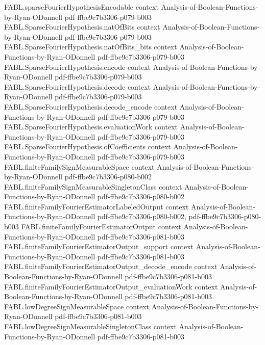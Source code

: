 \begin{theorem}
  {FABL.sparseFourierHypothesisEncodable}
  {context}
  {Analysis-of-Boolean-Functions-by-Ryan-ODonnell}
  {pdf-ffbe9c7b3306-p079-b003}
\proofstep
  {FABL.SparseFourierHypothesis.natOfBits}
  {context}
  {Analysis-of-Boolean-Functions-by-Ryan-ODonnell}
  {pdf-ffbe9c7b3306-p079-b003}
\proofstep
  {FABL.SparseFourierHypothesis.natOfBits_bits}
  {context}
  {Analysis-of-Boolean-Functions-by-Ryan-ODonnell}
  {pdf-ffbe9c7b3306-p079-b003}
\proofstep
  {FABL.SparseFourierHypothesis.encode}
  {context}
  {Analysis-of-Boolean-Functions-by-Ryan-ODonnell}
  {pdf-ffbe9c7b3306-p079-b003}
\proofstep
  {FABL.SparseFourierHypothesis.decode}
  {context}
  {Analysis-of-Boolean-Functions-by-Ryan-ODonnell}
  {pdf-ffbe9c7b3306-p079-b003}
\proofstep
  {FABL.SparseFourierHypothesis.decode_encode}
  {context}
  {Analysis-of-Boolean-Functions-by-Ryan-ODonnell}
  {pdf-ffbe9c7b3306-p079-b003}
\proofstep
  {FABL.SparseFourierHypothesis.evaluationWork}
  {context}
  {Analysis-of-Boolean-Functions-by-Ryan-ODonnell}
  {pdf-ffbe9c7b3306-p079-b003}
\proofstep
  {FABL.SparseFourierHypothesis.ofCoefficients}
  {context}
  {Analysis-of-Boolean-Functions-by-Ryan-ODonnell}
  {pdf-ffbe9c7b3306-p079-b003}
\proofstep
  {FABL.finiteFamilySignMeasurableSpace}
  {context}
  {Analysis-of-Boolean-Functions-by-Ryan-ODonnell}
  {pdf-ffbe9c7b3306-p080-b002}
\proofstep
  {FABL.finiteFamilySignMeasurableSingletonClass}
  {context}
  {Analysis-of-Boolean-Functions-by-Ryan-ODonnell}
  {pdf-ffbe9c7b3306-p080-b002}
\proofstep
  {FABL.finiteFamilyFourierEstimatorLabeledOutput}
  {context}
  {Analysis-of-Boolean-Functions-by-Ryan-ODonnell}
  {pdf-ffbe9c7b3306-p080-b002,
    pdf-ffbe9c7b3306-p080-b003}
\proofstep
  {FABL.finiteFamilyFourierEstimatorOutput}
  {context}
  {Analysis-of-Boolean-Functions-by-Ryan-ODonnell}
  {pdf-ffbe9c7b3306-p081-b003}
\proofstep
  {FABL.finiteFamilyFourierEstimatorOutput_support}
  {context}
  {Analysis-of-Boolean-Functions-by-Ryan-ODonnell}
  {pdf-ffbe9c7b3306-p081-b003}
\proofstep
  {FABL.finiteFamilyFourierEstimatorOutput_decode_encode}
  {context}
  {Analysis-of-Boolean-Functions-by-Ryan-ODonnell}
  {pdf-ffbe9c7b3306-p081-b003}
\proofstep
  {FABL.finiteFamilyFourierEstimatorOutput_evaluationWork}
  {context}
  {Analysis-of-Boolean-Functions-by-Ryan-ODonnell}
  {pdf-ffbe9c7b3306-p081-b003}
\proofstep
  {FABL.lowDegreeSignMeasurableSpace}
  {context}
  {Analysis-of-Boolean-Functions-by-Ryan-ODonnell}
  {pdf-ffbe9c7b3306-p081-b003}
\proofstep
  {FABL.lowDegreeSignMeasurableSingletonClass}
  {context}
  {Analysis-of-Boolean-Functions-by-Ryan-ODonnell}
  {pdf-ffbe9c7b3306-p081-b003}

\end{theorem}
